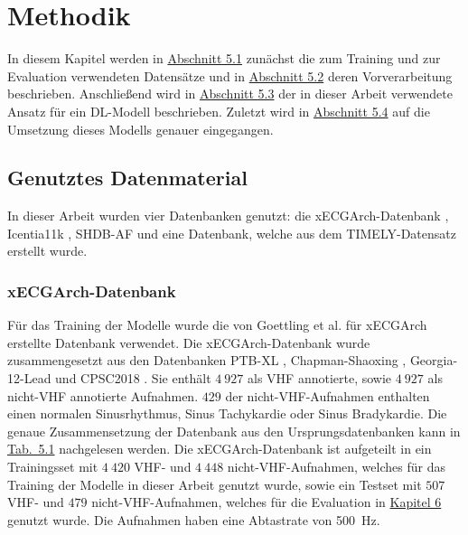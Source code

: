 \chapter{Methodik}\label{chap:methodik}

In diesem Kapitel werden in \hyperref[sec:daten]{Abschnitt 5.1} zunächst die zum Training und zur Evaluation verwendeten Datensätze und in \hyperref[sec:vorverarbeitung]{Abschnitt 5.2} deren Vorverarbeitung beschrieben. Anschließend wird in \hyperref[sec:architektur]{Abschnitt 5.3} der in dieser Arbeit verwendete Ansatz für ein \gls{DL}-Modell beschrieben. Zuletzt wird in \hyperref[sec:trainingsprozess]{Abschnitt 5.4} auf die Umsetzung dieses Modells genauer eingegangen.

\section{Genutztes Datenmaterial}\label{sec:daten}

In dieser Arbeit wurden vier Datenbanken genutzt: die xECGArch-Datenbank \cite{goettling_xecgarch_2024}, Icentia11k \cite{tan_icentia11k_2021} \cite{tan_icentia11k_2022}, \gls{SHDB-AF} \cite{tsutsui_shdb-af_2024} \cite{tsutsui_shdb-af_2024-1} und eine Datenbank, welche aus dem TIMELY-Datensatz \cite{schmitz_patient-centered_2022} erstellt wurde.

\subsection*{xECGArch-Datenbank}
Für das Training der Modelle wurde die von Goettling et al. \cite{goettling_xecgarch_2024} für  xECGArch erstellte Datenbank verwendet.  
Die xECGArch-Datenbank wurde zusammengesetzt aus den Datenbanken PTB-XL \cite{wagner_ptb-xl_2020} \cite{wagner_ptb-xl_nodate}, Chapman-Shaoxing \cite{zheng_12-lead_2020} \cite{zheng_large_nodate}, Georgia-12-Lead \cite{perez_alday_classification_2020} \cite{perez_alday_classification_nodate} und \gls{CPSC2018} \cite{liu_open_2018}. 
Sie enthält $4~927$ als \gls{VHF} annotierte, sowie $4~927$ als nicht-\gls{VHF} annotierte Aufnahmen. $429$ der nicht-\gls{VHF}-Aufnahmen enthalten einen normalen Sinusrhythmus, Sinus Tachykardie oder Sinus Bradykardie. Die genaue Zusammensetzung der Datenbank aus den Ursprungsdatenbanken kann in \hyperref[tab:Klassenverteilung_xECG]{Tab.~5.1} nachgelesen werden.
Die xECGArch-Datenbank ist aufgeteilt in ein Trainingsset mit $4~420$ \gls{VHF}- und $4~448$ nicht-\gls{VHF}-Aufnahmen, welches für das Training der Modelle in dieser Arbeit genutzt wurde, sowie ein Testset mit $507$ \gls{VHF}- und $479$ nicht-\gls{VHF}-Aufnahmen, welches für die Evaluation in \hyperref[chap:Ergebnisse]{Kapitel 6} genutzt wurde. Die Aufnahmen haben eine Abtastrate von 500~Hz. \cite{goettling_xecgarch_2024}

